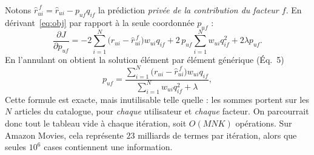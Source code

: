 \documentclass[11pt,a4paper]{article}
\begin{document}
Notons $\hat r^{\,f}_{ui}=\hat r_{ui}-p_{uf}q_{if}$ la prédiction \emph{privée de la
contribution du facteur $f$}. En dérivant~\eqref{eq:obj} par rapport à la seule
coordonnée $p_{uf}$ :
\begin{equation}
\frac{\partial J}{\partial p_{uf}}
= -2\sum_{i=1}^{N}\big(r_{ui}-\hat r^{\,f}_{ui}\big)w_{ui}q_{if}
+ 2\,p_{uf}\sum_{i=1}^{N} w_{ui}q_{if}^2 + 2\lambda p_{uf}.
\end{equation}
En l'annulant on obtient la solution élément par élément générique (Éq.~5)
\begin{equation}\label{eq:eq5}
p_{uf}=\frac{\sum_{i=1}^{N}\big(r_{ui}-\hat r^{\,f}_{ui}\big)w_{ui}q_{if}}
             {\sum_{i=1}^{N} w_{ui}q_{if}^2+\lambda},
\end{equation}
Cette formule est exacte, mais inutilisable telle quelle : les sommes portent sur les
$N$ articles du catalogue, pour \emph{chaque} utilisateur et \emph{chaque} facteur. On
parcourrait donc tout le tableau vide à chaque itération, soit $O(MNK)$ opérations. Sur
Amazon Movies, cela représente $23$ milliards de termes par itération, alors que seules
$10^6$ cases contiennent une information.
\end{document}
